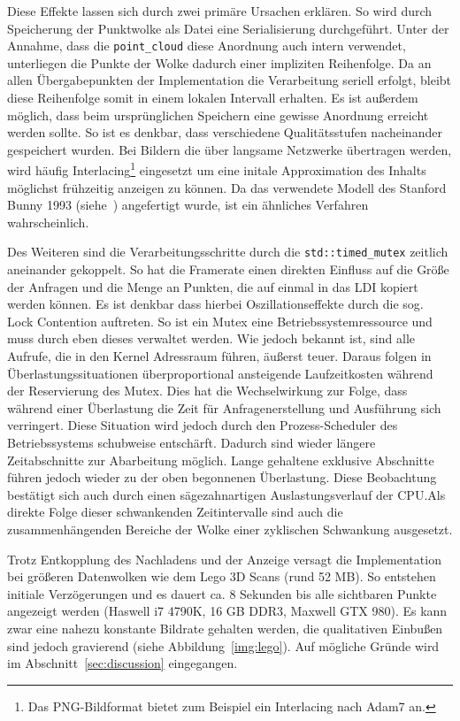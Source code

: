 \documentclass[hyperref, beleg, german, final, twoside]{cgvpub}
\begin{document}
Diese Effekte lassen sich durch zwei primäre Ursachen erklären. So wird durch
Speicherung der Punktwolke als Datei eine Serialisierung durchgeführt. Unter
der Annahme, dass die \texttt{point\_cloud} diese Anordnung auch intern
verwendet, unterliegen die Punkte der Wolke dadurch einer impliziten
Reihenfolge. Da an allen Übergabepunkten der Implementation die Verarbeitung
seriell erfolgt, bleibt diese Reihenfolge somit in einem lokalen Intervall
erhalten. Es ist außerdem möglich, dass beim ursprünglichen Speichern eine
gewisse Anordnung erreicht werden sollte. So ist es denkbar, dass verschiedene
Qualitätsstufen nacheinander gespeichert wurden. Bei Bildern die über langsame
Netzwerke übertragen werden, wird häufig Interlacing\footnote{Das
PNG-Bildformat bietet zum Beispiel ein Interlacing nach Adam7 an.} eingesetzt
um eine initale Approximation des Inhalts möglichst frühzeitig anzeigen zu
können. Da das verwendete Modell des Stanford Bunny 1993 (siehe~\cite{bunny})
angefertigt wurde, ist ein ähnliches Verfahren wahrscheinlich.

Des Weiteren sind die Verarbeitungsschritte durch die
\texttt{std::timed\_mutex} zeitlich aneinander gekoppelt. So hat die Framerate
einen direkten Einfluss auf die Größe der Anfragen und die Menge an Punkten,
die auf einmal in das LDI kopiert werden können. Es ist denkbar dass hierbei
Oszillationseffekte durch die sog. Lock Contention auftreten. So ist ein Mutex
eine Betriebssystemressource und muss durch eben dieses verwaltet werden. Wie
jedoch bekannt ist, sind alle Aufrufe, die in den Kernel Adressraum führen,
äußerst teuer. Daraus folgen in Überlastungssituationen überproportional
ansteigende Laufzeitkosten während der Reservierung des Mutex. Dies hat die
Wechselwirkung zur Folge, dass während einer Überlastung die Zeit für
Anfragenerstellung und Ausführung sich verringert. Diese Situation wird jedoch
durch den Prozess-Scheduler des Betriebssystems schubweise entschärft. Dadurch
sind wieder längere Zeitabschnitte zur Abarbeitung möglich. Lange gehaltene
exklusive Abschnitte führen jedoch wieder zu der oben begonnenen Überlastung.
Diese Beobachtung bestätigt sich auch durch einen sägezahnartigen
Auslastungsverlauf der CPU.\@ Als direkte Folge dieser schwankenden
Zeitintervalle sind auch die zusammenhängenden Bereiche der Wolke einer
zyklischen Schwankung ausgesetzt.

Trotz Entkopplung des Nachladens und der Anzeige versagt die Implementation bei
größeren Datenwolken wie dem Lego 3D Scans (rund 52 MB). So entstehen initiale
Verzögerungen und es dauert ca. 8 Sekunden bis alle sichtbaren Punkte angezeigt
werden (Haswell i7 4790K, 16 GB DDR3, Maxwell GTX 980). Es kann zwar eine
nahezu konstante Bildrate gehalten werden, die qualitativen Einbußen sind
jedoch gravierend (siehe Abbildung~\ref{img:lego}). Auf mögliche Gründe wird im
Abschnitt~\ref{sec:discussion} eingegangen.
\end{document}
